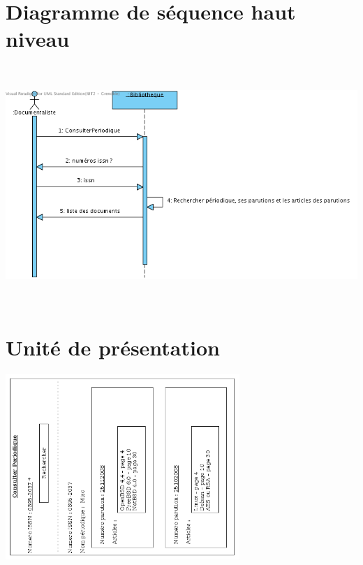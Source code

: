 \documentclass[a4paper,10pt]{report}
\begin{document}
\bigskip

\section*{Diagramme de séquence haut niveau}
\bigskip
\bigskip
\bigskip
\includegraphics[height=90mm]{ConsPeriodiqueHautNiveau.png}

\newpage

\section*{Unité de présentation}
\includegraphics[height=70mm]{UpConsPeriodique.png}
\end{document}

